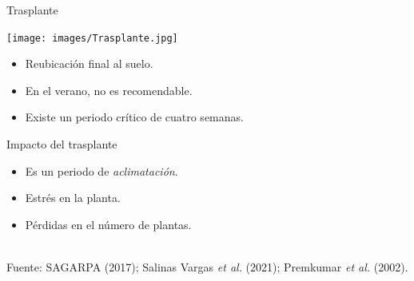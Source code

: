 \documentclass[aspectratio=169]{beamer}
\begin{document}
\begin{frame}{Trasplante}
    \vspace{-1cm}
    \begin{minipage}{0.5\textwidth}
			\hspace{-0.5cm}
            \centering
            \texttt{[image: images/Trasplante.jpg]}
		\end{minipage}%
		\begin{minipage}{0.5\textwidth}
            \begin{block}{}
                \begin{itemize}
				\item Reubicación final al suelo.
                    \item En el verano, no es recomendable.
                    \item Existe un periodo crítico de cuatro semanas.
			\end{itemize}
            \end{block}
            \pause
            \begin{block}{Impacto del trasplante}
                \begin{itemize}
				\item Es un periodo de \textit{aclimatación}.
                    \item Estrés en la planta.
                    \item Pérdidas en el número de plantas.
			\end{itemize}
            \end{block}
		\end{minipage}
        
        \,\\
        \hfill {\scriptsize Fuente: SAGARPA (2017); Salinas Vargas \textit{et al.} (2021); Premkumar \textit{et al.} (2002).}
\end{frame}
\end{document}
